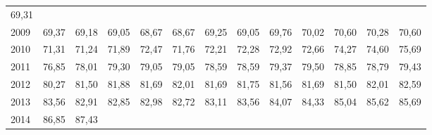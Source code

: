 \begin{tabular}{lllllllllllll}
  \multicolumn{1}{r}{69,31} \\
\multicolumn{1}{l}{\hspace{1em}2009} &
  \multicolumn{1}{|r}{69,37} &
  \multicolumn{1}{r}{69,18} &
  \multicolumn{1}{r}{69,05} &
  \multicolumn{1}{r}{68,67} &
  \multicolumn{1}{r}{68,67} &
  \multicolumn{1}{r}{69,25} &
  \multicolumn{1}{r}{69,05} &
  \multicolumn{1}{r}{69,76} &
  \multicolumn{1}{r}{70,02} &
  \multicolumn{1}{r}{70,60} &
  \multicolumn{1}{r}{70,28} &
  \multicolumn{1}{r}{70,60} \\
\multicolumn{1}{l}{\hspace{1em}2010} &
  \multicolumn{1}{|r}{71,31} &
  \multicolumn{1}{r}{71,24} &
  \multicolumn{1}{r}{71,89} &
  \multicolumn{1}{r}{72,47} &
  \multicolumn{1}{r}{71,76} &
  \multicolumn{1}{r}{72,21} &
  \multicolumn{1}{r}{72,28} &
  \multicolumn{1}{r}{72,92} &
  \multicolumn{1}{r}{72,66} &
  \multicolumn{1}{r}{74,27} &
  \multicolumn{1}{r}{74,60} &
  \multicolumn{1}{r}{75,69} \\
\multicolumn{1}{l}{\hspace{1em}2011} &
  \multicolumn{1}{|r}{76,85} &
  \multicolumn{1}{r}{78,01} &
  \multicolumn{1}{r}{79,30} &
  \multicolumn{1}{r}{79,05} &
  \multicolumn{1}{r}{79,05} &
  \multicolumn{1}{r}{78,59} &
  \multicolumn{1}{r}{78,59} &
  \multicolumn{1}{r}{79,37} &
  \multicolumn{1}{r}{79,50} &
  \multicolumn{1}{r}{78,85} &
  \multicolumn{1}{r}{78,79} &
  \multicolumn{1}{r}{79,43} \\
\multicolumn{1}{l}{\hspace{1em}2012} &
  \multicolumn{1}{|r}{80,27} &
  \multicolumn{1}{r}{81,50} &
  \multicolumn{1}{r}{81,88} &
  \multicolumn{1}{r}{81,69} &
  \multicolumn{1}{r}{82,01} &
  \multicolumn{1}{r}{81,69} &
  \multicolumn{1}{r}{81,75} &
  \multicolumn{1}{r}{81,56} &
  \multicolumn{1}{r}{81,69} &
  \multicolumn{1}{r}{81,50} &
  \multicolumn{1}{r}{82,01} &
  \multicolumn{1}{r}{82,59} \\
\multicolumn{1}{l}{\hspace{1em}2013} &
  \multicolumn{1}{|r}{83,56} &
  \multicolumn{1}{r}{82,91} &
  \multicolumn{1}{r}{82,85} &
  \multicolumn{1}{r}{82,98} &
  \multicolumn{1}{r}{82,72} &
  \multicolumn{1}{r}{83,11} &
  \multicolumn{1}{r}{83,56} &
  \multicolumn{1}{r}{84,07} &
  \multicolumn{1}{r}{84,33} &
  \multicolumn{1}{r}{85,04} &
  \multicolumn{1}{r}{85,62} &
  \multicolumn{1}{r}{85,69} \\
\multicolumn{1}{l}{\hspace{1em}2014} &
  \multicolumn{1}{|r}{86,85} &
  \multicolumn{1}{r}{87,43} &

\end{tabular}
